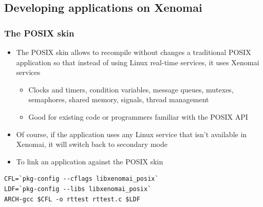 \subsection{Developing applications on Xenomai}

\begin{frame}[fragile]
  \frametitle{The POSIX skin}
  \begin{itemize}
  \item The POSIX skin allows to recompile without changes a
    traditional POSIX application so that instead of using Linux
    real-time services, it uses Xenomai services
    \begin{itemize}
    \item Clocks and timers, condition variables, message queues,
      mutexes, semaphores, shared memory, signals, thread management
    \item Good for existing code or programmers familiar with the
      POSIX API
    \end{itemize}
  \item Of course, if the application uses any Linux service that
    isn't available in Xenomai, it will switch back to secondary mode
  \item To link an application against the POSIX skin
  \end{itemize}
  \begin{block}{}
\small
\begin{verbatim}
CFL=`pkg-config --cflags libxenomai_posix`
LDF=`pkg-config --libs libxenomai_posix`
ARCH-gcc $CFL -o rttest rttest.c $LDF
\end{verbatim}
\normalsize
\end{block}
\end{frame}

